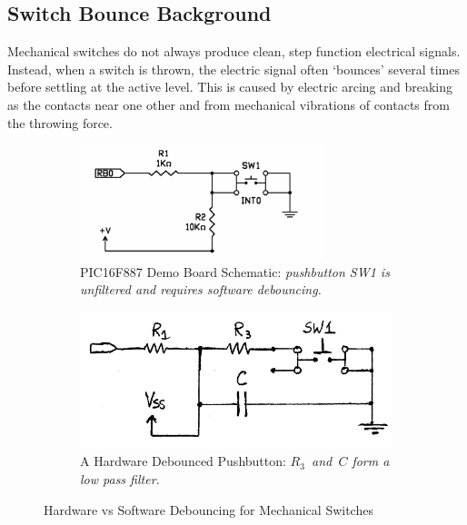 \documentclass[11pt]{article}
\begin{document}
\subsection{Switch Bounce Background}

Mechanical switches do not always produce clean, step function electrical signals.
Instead, when a switch is thrown, the electric signal often `bounces' several times
before settling at the active level. This is caused by electric arcing and breaking
as the contacts near one other and from mechanical vibrations of contacts from the
throwing force.

\begin{figure}
\centering
	\begin{subfigure}[b]{.4\textwidth}
		\centering
		\includegraphics[width=\textwidth]{Figures/demo-board-pushbutton-circuit.pdf}
		\caption[]%
		{{PIC16F887 Demo Board Schematic: \emph{pushbutton SW1 is unfiltered and requires software debouncing.}}}
	\end{subfigure}
	\quad
	\begin{subfigure}[b]{0.5\textwidth}
		\centering
		\includegraphics[width=\textwidth]{Figures/filtered-pushbutton-circuit.pdf}
		\caption[]%
		{{\small A Hardware Debounced Pushbutton: \emph{\mbox{$R_{3}$ and $C$} form a low pass filter.}}}
	\end{subfigure}	
	\caption{Hardware vs Software Debouncing for Mechanical Switches}
	\label{io-circuit-diagram}
\end{figure}
\end{document}
